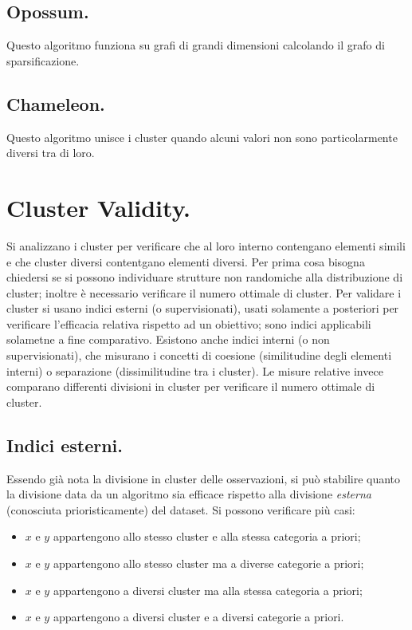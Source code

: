 \documentclass[11pt, a4page, twocolumn]{article}
\begin{document}
\subsection{Opossum.}
Questo algoritmo funziona su grafi di grandi dimensioni calcolando il grafo di sparsificazione.

\subsection{Chameleon.}
Questo algoritmo unisce i cluster quando alcuni valori non sono particolarmente diversi tra di loro.

\section{Cluster Validity.}
Si analizzano i cluster per verificare che al loro interno contengano elementi simili e che cluster diversi contentgano elementi diversi.
Per prima cosa bisogna chiedersi se si possono individuare strutture non randomiche alla distribuzione di cluster; inoltre è necessario verificare il numero ottimale di cluster.
Per validare i cluster si usano indici esterni (o supervisionati), usati solamente a posteriori per verificare l'efficacia relativa rispetto ad un obiettivo; sono indici applicabili solametne a fine comparativo.
Esistono anche indici interni (o non supervisionati), che misurano i concetti di coesione (similitudine degli elementi interni) o separazione (dissimilitudine tra i cluster).
Le misure relative invece comparano differenti divisioni in cluster per verificare il numero ottimale di cluster.

\subsection{Indici esterni.}
Essendo già nota la divisione in cluster delle osservazioni, si può stabilire quanto la divisione data da un algoritmo sia efficace rispetto alla divisione \textit{esterna} (conosciuta prioristicamente) del dataset.
Si possono verificare più casi:
\begin{itemize}
\item $x$ e $y$ appartengono allo stesso cluster e alla stessa categoria a priori;
\item $x$ e $y$ appartengono allo stesso cluster ma a diverse categorie a priori;
\item $x$ e $y$ appartengono a diversi cluster ma alla stessa categoria a priori;
\item $x$ e $y$ appartengono a diversi cluster e a diversi categorie a priori.
\end{itemize}
\end{document}
